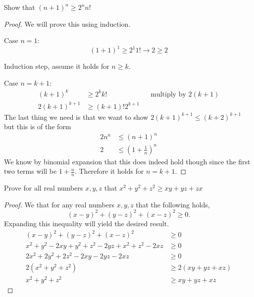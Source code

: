 \documentclass[11pt]{article}
\newenvironment{problem}[2][Problem\!]{\begin{trivlist}
\item[\hskip \labelsep {\bfseries #1}\hskip \labelsep {\bfseries #2}]}{\end{trivlist}}
\renewcommand{\geq}{\geqslant}
\renewcommand{\leq}{\leqslant}
\begin{document}
\newpage
\begin{tcolorbox}
    \begin{problem} {OC - 10/25 - 61.}
        Show that $(n+1)^{n} \geq 2^{n}n!$
    \end{problem}
\end{tcolorbox}
\begin{proof}
    We will prove this using induction. 

    Case $n = 1$: \[(1+1)^{1} \geq 2^{1}1! \rightarrow 2 \geq 2\]

    Induction step, assume it holds for $n \geq k$.

    Case $n = k+1$:
    \begin{align*}
        (k+1)^{k} &\geq 2^{k}k! && \text{multiply by } 2(k+1) \\
        2(k+1)^{k+1} &\geq (k+1)!2^{k+1}
    \end{align*}
    The last thing we need is that we want to show $2(k+1)^{k+1} \leq (k+2)^{k+1}$ but this is of the form
    \begin{align*}
        2n^{n} &\leq (n+1)^{n} \\
        2 &\leq (1 + \frac{1}{n})^{n}
    \end{align*} 
    We know by binomial expansion that this does indeed hold though since the first two terms will be $1 + \frac{n}{n}$.
    Therefore it holds for $n = k+1$.
\end{proof}
\begin{tcolorbox}
    \begin{problem} {IC - 10/27 - 99.}
        Prove for all real numbers $x,y,z$ that $x^{2} + y^{2} + z^{2} \geq xy + yz + zx$
    \end{problem}
\end{tcolorbox}
\begin{proof}
    We that for any real numbers $x,y,z$ that the following holds, \[(x-y)^{2} + (y-z)^{2} + (x-z)^{2}\geq 0.\]
    Expanding this inequality will yield the desired result.
    \begin{align*}
        (x-y)^{2} + (y-z)^{2} + (x-z)^{2}&\geq 0 \\
        x^{2} + y^{2} -2xy + y^{2} + z^{2} -2yz + x^{2} + z^{2} -2xz &\geq 0 \\
        2x^{2} + 2y^{2} + 2z^{2} -2xy -2yz -2xz &\geq 0 \\
        2(x^{2} + y^{2} + z^{2}) &\geq 2(xy + yz + xz) \\
        x^{2} + y^{2} + z^{2} &\geq xy + yz + xz
    \end{align*}
\end{proof}
\end{document}
